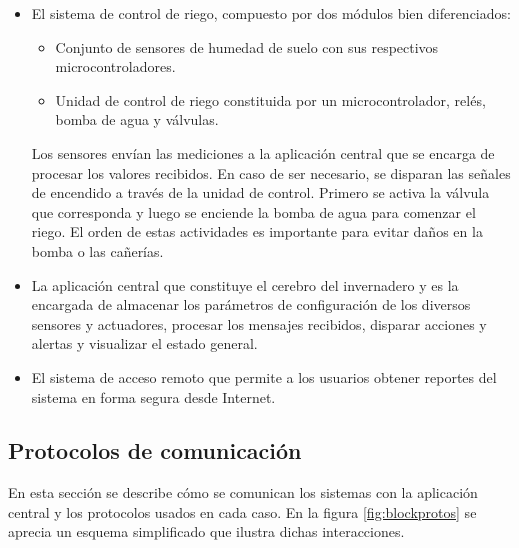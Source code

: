\begin{itemize}
\item El sistema de control de riego, compuesto por dos módulos bien diferenciados:
\begin{itemize}
\item Conjunto de sensores de humedad de suelo con sus respectivos microcontroladores.
\item Unidad de control de riego constituida por un microcontrolador, relés, bomba de agua y válvulas.
\end{itemize}

Los sensores envían las mediciones a la aplicación central que se encarga de procesar los valores recibidos. En caso de ser necesario, se disparan las señales de encendido a través de la unidad de control. Primero se activa la válvula que corresponda y luego se enciende la bomba de agua para comenzar el riego. El orden de estas actividades es importante para evitar daños en la bomba o las cañerías.

\item La aplicación central que constituye el cerebro del invernadero y es la encargada de almacenar los parámetros de configuración de los diversos sensores y actuadores, procesar los mensajes recibidos, disparar acciones y alertas y visualizar el estado general.

\item El sistema de acceso remoto que permite a los usuarios obtener reportes del sistema en forma segura desde Internet.   
\end{itemize}

\subsection{Protocolos de comunicación}
\label{Protocolos de comunicación}


En esta sección se describe cómo se comunican los sistemas con la aplicación central y los protocolos usados en cada caso. En la figura \ref{fig:blockprotos} se aprecia un esquema simplificado que ilustra dichas interacciones.

